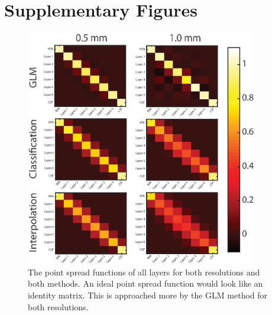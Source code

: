 \section{Supplementary Figures}
\renewcommand{\thefigure}{S\arabic{figure}}
\setcounter{figure}{0}
\begin{figure}[ht]
\centering
\includegraphics[width=0.9\textwidth, clip=true]{./Chapters/03_GLM/./Images/PointSpreadMatrices}
\caption{The point spread functions of all layers for both resolutions and both methods. An ideal point spread function would look like an identity matrix. This is approached more by the GLM method for both resolutions.}
\label{fig:pointspreadall}
\end{figure}